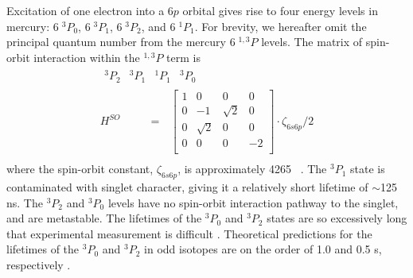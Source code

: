 \documentclass[12pt]{mitthesis}
\begin{document}
Excitation of one electron into a $6p$ orbital gives rise to four
energy levels in mercury: $6 \; ^3P_0$, $6 \; ^3P_1$, $6 \; ^3P_2$,
and $6 \; ^1P_1$.  For brevity, we hereafter omit the principal
quantum number from the mercury $6 \; ^{1,3}P$ levels.  The matrix of
spin-orbit interaction within the $^{1,3}P$ term is
\begin{equation}
\begin{split}
 \begin{array}{cccc}^3P_2 & ^3P_1 & ^1P_1 & ^3P_0\end{array}
 \:\:\:\:\:\:\:\:\:\:\:\:\:\:\:\:\\
H^{SO} \:\:\:\:\:\:\:\:\:\:\: = \:\:\:
    \begin{bmatrix}
     1 & 0 & 0 & 0  \\
     0 & -1 & \sqrt{2} & 0 \\   
     0 & \sqrt{2} & 0 & 0 \\ 
     0 & 0 & 0 & -2 \\  
    \end{bmatrix}
  \cdot \zeta_{6s6p}/2\\
\end{split}
\end{equation}
where the spin-orbit constant, $\zeta_{6s6p}$, is approximately 4265
\rcm\ \cite{field04}.  The $^3P_1$ state is contaminated with singlet
character, giving it a relatively short lifetime of $\sim$125 ns.  The
$^3P_2$ and $^3P_0$ levels have no spin-orbit interaction pathway to
the singlet, and are metastable.  The lifetimes of the $^3P_0$ and
$^3P_2$ states are so excessively long that experimental measurement
is difficult \cite{wexler80}.  Theoretical predictions for the
lifetimes of the $^3P_0$ and $^3P_2$ in odd isotopes are on the order
of 1.0 and 0.5 s, respectively \cite{mishra01}.
\end{document}
